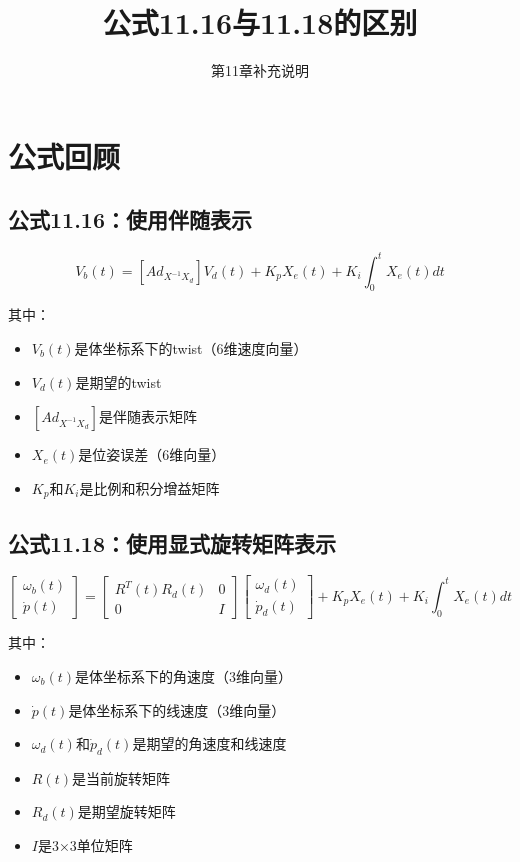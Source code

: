 \documentclass[12pt,a4paper]{article}
\title{公式11.16与11.18的区别}
\author{第11章补充说明}
\date{}
\begin{document}
\maketitle

\section{公式回顾}

\subsection{公式11.16：使用伴随表示}

\begin{equation}
V_b(t) = [Ad_{X^{-1}X_d}] V_d(t) + K_p X_e(t) + K_i \int_0^t X_e(t) dt
\label{eq:11.16}
\end{equation}

其中：
\begin{itemize}
\item $V_b(t)$是体坐标系下的twist（6维速度向量）
\item $V_d(t)$是期望的twist
\item $[Ad_{X^{-1}X_d}]$是伴随表示矩阵
\item $X_e(t)$是位姿误差（6维向量）
\item $K_p$和$K_i$是比例和积分增益矩阵
\end{itemize}

\subsection{公式11.18：使用显式旋转矩阵表示}

\begin{equation}
\begin{bmatrix}
\omega_b(t) \\
\dot{p}(t)
\end{bmatrix}
=
\begin{bmatrix}
R^T(t)R_d(t) & 0 \\
0 & I
\end{bmatrix}
\begin{bmatrix}
\omega_d(t) \\
\dot{p}_d(t)
\end{bmatrix}
+ K_p X_e(t) + K_i \int_0^t X_e(t) dt
\label{eq:11.18}
\end{equation}

其中：
\begin{itemize}
\item $\omega_b(t)$是体坐标系下的角速度（3维向量）
\item $\dot{p}(t)$是体坐标系下的线速度（3维向量）
\item $\omega_d(t)$和$\dot{p}_d(t)$是期望的角速度和线速度
\item $R(t)$是当前旋转矩阵
\item $R_d(t)$是期望旋转矩阵
\item $I$是3×3单位矩阵
\end{itemize}
\end{document}
